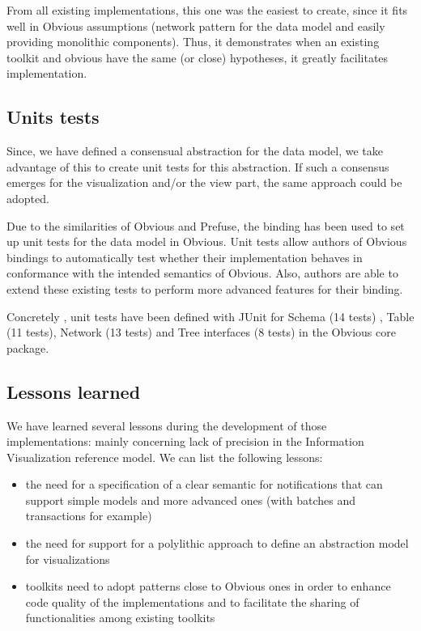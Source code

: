 From all existing implementations, this one was the easiest to create, since it fits well in Obvious assumptions (network pattern for the data model and easily providing monolithic components). Thus, it demonstrates when an existing toolkit and obvious have the same (or close)  hypotheses, it greatly facilitates implementation.

\subsection{Units tests}

Since, we have defined a consensual abstraction for the data model, we take advantage of this to create unit tests for this abstraction. If such a consensus emerges for the visualization and/or the view part, the same approach could be adopted.

Due to the similarities of Obvious and Prefuse, the binding has been used to set up unit tests for the data model in Obvious. Unit tests allow authors of Obvious bindings to automatically test whether their implementation behaves in conformance with the intended semantics of Obvious. Also, authors are able to extend these existing tests to perform more advanced features for their binding.

Concretely , unit tests have been defined with JUnit  for Schema (14 tests) , Table (11 tests), Network (13 tests) and Tree interfaces (8 tests) in the Obvious core package.

\subsection{Lessons learned}

We have learned several lessons during the development of those implementations: mainly concerning lack of precision in the Information Visualization reference model. We can list the following lessons:

\begin{itemize}
\item the need for a specification of a clear semantic for notifications that can support simple models and more advanced ones (with batches and transactions for example)
\item the need for support for a polylithic approach to define an abstraction model for visualizations
\item toolkits need to adopt patterns close to Obvious ones in order to enhance code quality of the implementations and to facilitate the sharing of functionalities among existing toolkits
\end{itemize}



